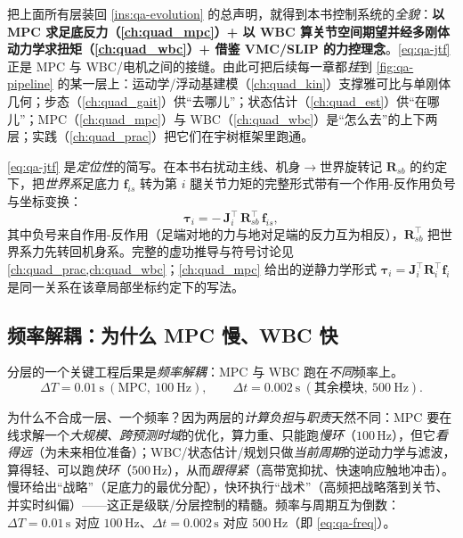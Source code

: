 \begin{insight}\label{ins:qa-assemble}
把上面所有层装回 \cref{ins:qa-evolution} 的总声明，就得到本书控制系统的\emph{全貌}：\textbf{以 MPC 求足底反力（\cref{ch:quad_mpc}）+ 以 WBC 算关节空间期望并经多刚体动力学求扭矩（\cref{ch:quad_wbc}）+ 借鉴 VMC/SLIP 的力控理念}\cite{yu2021quadruped}。\cref{eq:qa-jtf} 正是 MPC 与 WBC/电机之间的接缝。由此可把后续每一章都\emph{挂}到 \cref{fig:qa-pipeline} 的某一层上：运动学/浮动基建模（\cref{ch:quad_kin}）支撑雅可比与单刚体几何；步态（\cref{ch:quad_gait}）供“去哪儿”；状态估计（\cref{ch:quad_est}）供“在哪儿”；MPC（\cref{ch:quad_mpc}）与 WBC（\cref{ch:quad_wbc}）是“怎么去”的上下两层；实践（\cref{ch:quad_prac}）把它们在宇树框架里跑通。
\end{insight}

\begin{note}\label{note:qa-jtf-sign}
\cref{eq:qa-jtf} 是\emph{定位性}的简写。在本书右扰动主线、机身$\to$世界旋转记 $\mathbf{R}_{sb}$ 的约定下，把\emph{世界系}足底力 $\mathbf{f}_{is}$ 转为第 $i$ 腿关节力矩的完整形式带有一个作用-反作用负号与坐标变换：
\[
  \boldsymbol\tau_i=-\,\mathbf{J}_i^\top\,\mathbf{R}_{sb}^\top\,\mathbf{f}_{is},
\]
其中负号来自作用-反作用（足端对地的力与地对足端的反力互为相反），$\mathbf{R}_{sb}^\top$ 把世界系力先转回机身系。完整的虚功推导与符号讨论见 \cref{ch:quad_prac,ch:quad_wbc}；\cref{ch:quad_mpc} 给出的逆静力学形式 $\boldsymbol\tau_i=\mathbf{J}_i^\top\mathbf{R}_i^\top\mathbf{f}_i$ 是同一关系在该章局部坐标约定下的写法。
\end{note}

\subsection{频率解耦：为什么 MPC 慢、WBC 快}
\label{subsec:qa-freq}

分层的一个关键工程后果是\emph{频率解耦}：MPC 与 WBC 跑在\emph{不同}频率上\cite{yu2021quadruped}。
\begin{equation}
  \Delta T=0.01\ \text{s}\ (\text{MPC},\ 100\ \text{Hz}),
  \qquad
  \Delta t=0.002\ \text{s}\ (\text{其余模块},\ 500\ \text{Hz}).
  \label{eq:qa-freq}
\end{equation}

\begin{insight}\label{ins:qa-freq}
为什么不合成一层、一个频率？因为两层的\emph{计算负担}与\emph{职责}天然不同：MPC 要在线求解一个\emph{大规模、跨预测时域}的优化，算力重、只能跑\emph{慢环}（$100\,\mathrm{Hz}$），但它\emph{看得远}（为未来相位准备）；WBC/状态估计/规划只做\emph{当前周期}的逆动力学与滤波，算得轻、可以跑\emph{快环}（$500\,\mathrm{Hz}$），从而\emph{跟得紧}（高带宽抑扰、快速响应触地冲击）。慢环给出“战略”（足底力的最优分配），快环执行“战术”（高频把战略落到关节、并实时纠偏）——这正是级联/分层控制的精髓。频率与周期互为倒数：$\Delta T=0.01\,\mathrm{s}$ 对应 $100\,\mathrm{Hz}$、$\Delta t=0.002\,\mathrm{s}$ 对应 $500\,\mathrm{Hz}$（即 \cref{eq:qa-freq}）。
\end{insight}

